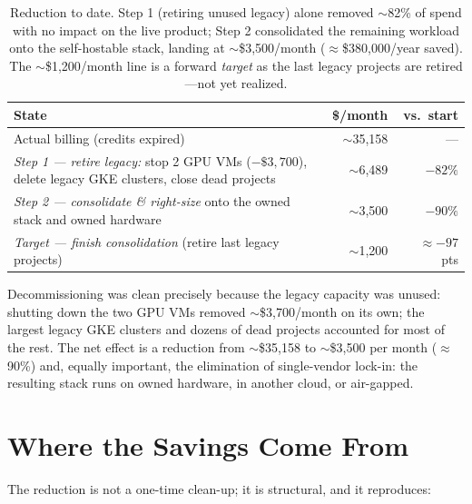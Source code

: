 \documentclass[11pt,letterpaper]{article}
\begin{document}
\begin{table}[h]
\centering
\small
\begin{tabular}{p{} r r}
\toprule
\textbf{State} & \textbf{\$/month} & \textbf{vs.\ start} \\
\midrule
Actual billing (credits expired) & $\sim$35{,}158 & --- \\
\midrule
\emph{Step 1 --- retire legacy:} stop 2 GPU VMs ($-\$3{,}700$),
delete legacy GKE clusters, close dead projects & $\sim$6{,}489 & $-82\%$ \\
\emph{Step 2 --- consolidate \& right-size} onto the owned stack
and owned hardware & $\sim$3{,}500 & $-90\%$ \\
\midrule
\emph{Target --- finish consolidation} (retire last legacy projects) & $\sim$1{,}200 & $\approx$$-97$ pts \\
\bottomrule
\end{tabular}
\caption{Reduction to date. Step 1 (retiring unused legacy) alone removed $\sim$82\%
of spend with no impact on the live product; Step 2 consolidated the remaining
workload onto the self-hostable stack, landing at $\sim$\$3{,}500/month
($\approx$\$380{,}000/year saved). The $\sim$\$1{,}200/month line is a forward
\emph{target} as the last legacy projects are retired---not yet realized.}
\end{table}

Decommissioning was clean precisely because the legacy capacity was unused: shutting
down the two GPU VMs removed $\sim$\$3{,}700/month on its own; the largest legacy
GKE clusters and dozens of dead projects accounted for most of the rest. The net
effect is a reduction from $\sim$\$35{,}158 to $\sim$\$3{,}500 per month
($\approx$90\%) and, equally important, the elimination of single-vendor lock-in:
the resulting stack runs on owned hardware, in another cloud, or air-gapped.

\section{Where the Savings Come From}

The reduction is not a one-time clean-up; it is structural, and it reproduces:
\end{document}
